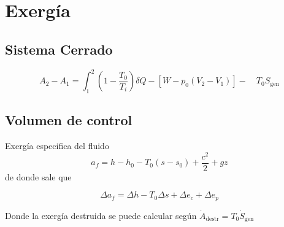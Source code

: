 \documentclass{article}
\newcommand{\Sgen}{S_{\textrm{gen}}}
\newcommand{\dSgen}{\dot{S}_{\textrm{gen}}}
\newcommand{\dAdestr}{\dot{A}_{\mathrm{destr}}}
\begin{document}
\section{Exergía}
\subsection{Sistema Cerrado}

\begin{equation}
	A_2 - A_{1}=\int_{1}^{2}\left(1-\frac{T_{0}}{T_{i}}\right) \delta Q-\left[W-p_{0}\left(V_{2}-V_{1}\right)\right]-\quad T_{0} \Sgen
\end{equation}

\subsection{Volumen de control}
Exergía especifica del fluido
\[
a_f = h-h_{0}-T_{0}\left(s-s_{0}\right)+\frac{c^{2}}{2}+g z
\]
de donde sale que 

\begin{equation}
	\Delta a_f = \Delta h - T_0 \Delta s + \Delta e_c + \Delta e_p
\end{equation}

Donde la exergía destruida se puede calcular según $\dAdestr = T_0 \dSgen $
\end{document}
